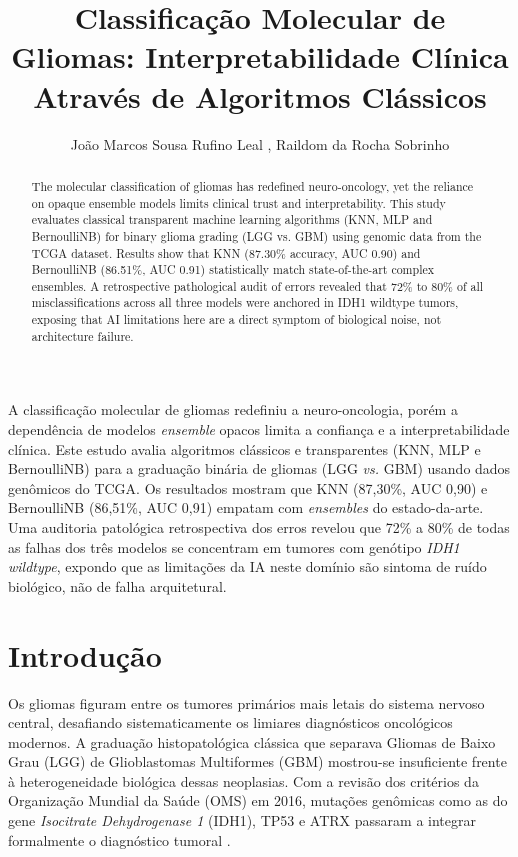 \documentclass[12pt]{article}
\title{Classificação Molecular de Gliomas: Interpretabilidade Clínica Através de Algoritmos Clássicos}
\author{João Marcos Sousa Rufino Leal \inst{1}, Raildom da Rocha Sobrinho\inst{2}}
\begin{document}
\maketitle

\begin{abstract}
The molecular classification of gliomas has redefined neuro-oncology, yet the reliance on opaque ensemble models limits clinical trust and interpretability. This study evaluates classical transparent machine learning algorithms (KNN, MLP and BernoulliNB) for binary glioma grading (LGG vs. GBM) using genomic data from the TCGA dataset. Results show that KNN (87.30\% accuracy, AUC 0.90) and BernoulliNB (86.51\%, AUC 0.91) statistically match state-of-the-art complex ensembles. A retrospective pathological audit of errors revealed that 72\% to 80\% of all misclassifications across all three models were anchored in IDH1 wildtype tumors, exposing that AI limitations here are a direct symptom of biological noise, not architecture failure.
\end{abstract}

\begin{resumo}
A classificação molecular de gliomas redefiniu a neuro-oncologia, porém a dependência de modelos \textit{ensemble} opacos limita a confiança e a interpretabilidade clínica. Este estudo avalia algoritmos clássicos e transparentes (KNN, MLP e BernoulliNB) para a graduação binária de gliomas (LGG \textit{vs.} GBM) usando dados genômicos do TCGA. Os resultados mostram que KNN (87,30\%, AUC 0,90) e BernoulliNB (86,51\%, AUC 0,91) empatam com \textit{ensembles} do estado-da-arte. Uma auditoria patológica retrospectiva dos erros revelou que 72\% a 80\% de todas as falhas dos três modelos se concentram em tumores com genótipo \textit{IDH1 wildtype}, expondo que as limitações da IA neste domínio são sintoma de ruído biológico, não de falha arquitetural.
\end{resumo}

\section{Introdução}

Os gliomas figuram entre os tumores primários mais letais do sistema nervoso central, desafiando sistematicamente os limiares diagnósticos oncológicos modernos. A graduação histopatológica clássica que separava Gliomas de Baixo Grau (LGG) de Glioblastomas Multiformes (GBM) mostrou-se insuficiente frente à heterogeneidade biológica dessas neoplasias. Com a revisão dos critérios da Organização Mundial da Saúde (OMS) em 2016, mutações genômicas como as do gene \textit{Isocitrate Dehydrogenase 1} (IDH1), TP53 e ATRX passaram a integrar formalmente o diagnóstico tumoral \cite{tasci2022, ren2019}.
\end{document}
